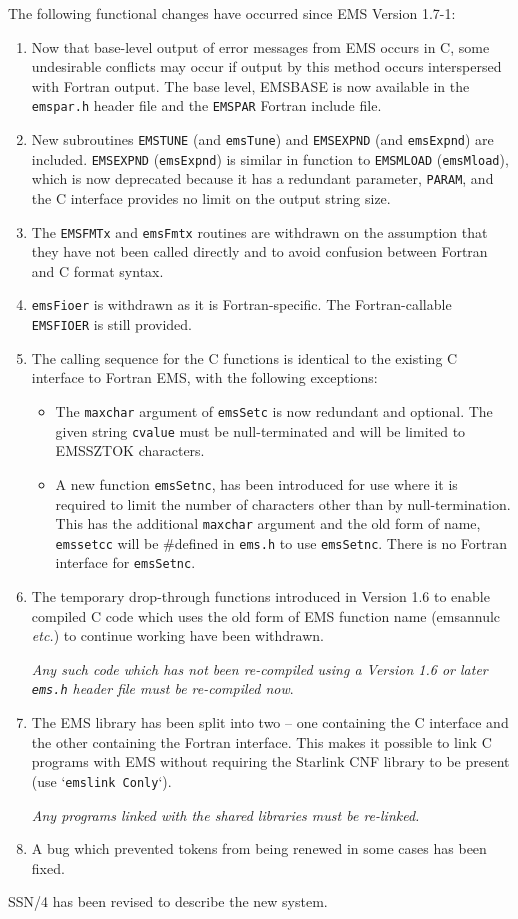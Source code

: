 \documentclass[twoside,11pt]{article}
\renewcommand{\_}{\texttt{\symbol{95}}}
\begin{document}
The following functional changes have occurred since EMS Version 1.7-1:
\begin{enumerate}
\item Now that base-level output of error messages from EMS occurs in C, some
undesirable conflicts may occur if output by this method occurs interspersed
with Fortran output. The base level, EMS\_\_BASE is now available in the
\texttt{ems\_par.h} header file and the \texttt{EMS\_PAR} Fortran include file.
\item New subroutines \texttt{EMS\_TUNE} (and \texttt{emsTune}) and 
\texttt{EMS\_EXPND} (and \texttt{emsExpnd}) are included.
\texttt{EMS\_EXPND} (\texttt{emsExpnd}) is similar in function to 
\texttt{EMS\_MLOAD} (\texttt{emsMload}), which is now deprecated because it
has a redundant parameter, \texttt{PARAM}, and the C interface provides no
limit on the output string size.
\item The \texttt{EMS\_FMTx} and \texttt{emsFmtx} routines are withdrawn on the
assumption that they have not been called directly and to avoid confusion
between Fortran and C format syntax.
\item \texttt{emsFioer} is withdrawn as it is Fortran-specific.
The Fortran-callable \texttt{EMS\_FIOER} is still provided.
\item The calling sequence for the C functions is identical to the existing C
interface to Fortran EMS, with the following exceptions:
\begin{itemize}
\item The \texttt{maxchar} argument of \texttt{emsSetc} is now redundant and
optional. The given string \texttt{cvalue} must be null-terminated and will be
limited to EMS\_\_SZTOK characters.
\item A new function \texttt{emsSetnc}, has been introduced for use where it is
required to limit the number of characters other than by null-termination. 
This has the additional \texttt{maxchar} argument and the old form of name, 
\texttt{ems\_setc\_c} will be \#defined in \texttt{ems.h} to use
\texttt{emsSetnc}. There is no Fortran interface for \texttt{emsSetnc}.
\end{itemize}
\item The temporary drop-through functions introduced in Version 1.6 to enable
compiled C code which uses the old form of EMS function name (ems\_annul\_c
\textit{etc.}) to continue working have been withdrawn. 

\emph{Any such code which has not been re-compiled using a Version 1.6 or later
\texttt{ems.h} header file must be re-compiled now}.
\item The EMS library has been split into two -- one containing the C interface
and the other containing the Fortran interface. This makes it possible to
link C programs with EMS without requiring the Starlink CNF library to be
present (use `\texttt{ems\_link Conly}`). 

\emph{Any programs linked with the shared libraries must be re-linked.}
\item A bug which prevented tokens from being renewed in some cases has been 
fixed.
\end{enumerate}
SSN/4 has been revised to describe the new system.
\end{document}

